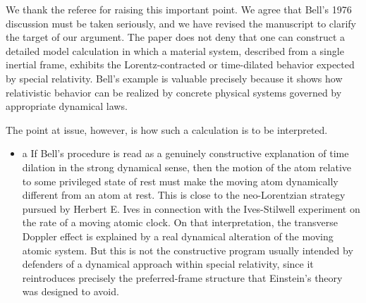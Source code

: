 \documentclass[submitted,11pt]{article}
\begin{document}
\begin{reply}
We thank the referee for raising this important point. We agree that Bell’s 1976 discussion must be taken seriously, and we have revised the manuscript to clarify the target of our argument. The paper does not deny that one can construct a detailed model calculation in which a material system, described from a single inertial frame, exhibits the Lorentz-contracted or time-dilated behavior expected by special relativity. Bell’s example is valuable precisely because it shows how relativistic behavior can be realized by concrete physical systems governed by appropriate dynamical laws.

The point at issue, however, is how such a calculation is to be interpreted. 

\begin{itemize}
\item a If Bell’s procedure is read as a genuinely constructive explanation of time dilation in the strong dynamical sense, then the motion of the atom relative to some privileged state of rest must make the moving atom dynamically different from an atom at rest. This is close to the neo-Lorentzian strategy pursued by Herbert E. Ives in connection with the Ives-Stilwell experiment on the rate of a moving atomic clock. On that interpretation, the transverse Doppler effect is explained by a real dynamical alteration of the moving atomic system. But this is not the constructive program usually intended by defenders of a dynamical approach within special relativity, since it reintroduces precisely the preferred-frame structure that Einstein’s theory was designed to avoid.


\end{itemize}
\end{reply}
\end{document}
